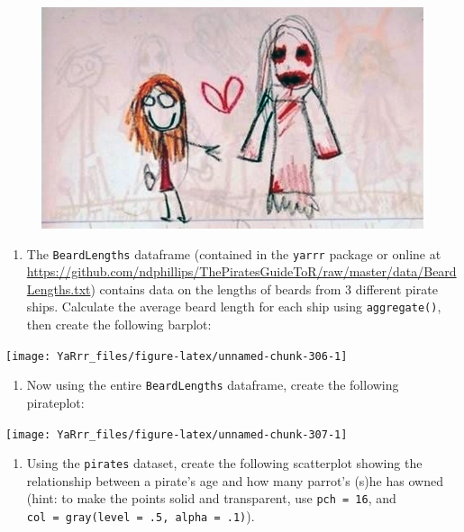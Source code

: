 \documentclass[]{book}
\providecommand{\tightlist}{%
  \setlength{\itemsep}{0pt}\setlength{\parskip}{0pt}}
\theoremstyle{definition}
\theoremstyle{definition}
\theoremstyle{remark}
\begin{document}
\begin{figure}

{\centering \includegraphics[width=0.75\linewidth]{images/scarydrawing} 

}

\end{figure}

\begin{enumerate}
\def\labelenumi{\arabic{enumi}.}
\tightlist
\item
  The \texttt{BeardLengths} dataframe (contained in the \texttt{yarrr}
  package or online at
  \url{https://github.com/ndphillips/ThePiratesGuideToR/raw/master/data/BeardLengths.txt})
  contains data on the lengths of beards from 3 different pirate ships.
  Calculate the average beard length for each ship using
  \texttt{aggregate()}, then create the following barplot:
\end{enumerate}

\begin{center}\texttt{[image: YaRrr\_files/figure-latex/unnamed-chunk-306-1]} \end{center}

\begin{enumerate}
\def\labelenumi{\arabic{enumi}.}
\setcounter{enumi}{1}
\tightlist
\item
  Now using the entire \texttt{BeardLengths} dataframe, create the
  following pirateplot:
\end{enumerate}

\begin{center}\texttt{[image: YaRrr\_files/figure-latex/unnamed-chunk-307-1]} \end{center}

\begin{enumerate}
\def\labelenumi{\arabic{enumi}.}
\setcounter{enumi}{2}
\tightlist
\item
  Using the \texttt{pirates} dataset, create the following scatterplot
  showing the relationship between a pirate's age and how many parrot's
  (s)he has owned (hint: to make the points solid and transparent, use
  \texttt{pch\ =\ 16}, and
  \texttt{col\ =\ gray(level\ =\ .5,\ alpha\ =\ .1)}).
\end{enumerate}
\end{document}

